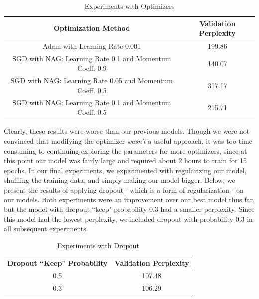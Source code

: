 \documentclass[a4paper]{article}
\begin{document}
\begin{table}[h!]
\centering
\begin{tabular}{|c | c|} 
 \hline
Optimization Method & Validation Perplexity \\ \hline \hline
Adam with Learning Rate 0.001 & 199.86 \\ \hline
SGD with NAG: Learning Rate 0.1 and Momentum Coeff. 0.9 & 140.07\\ \hline
SGD with NAG: Learning Rate 0.05 and Momentum Coeff. 0.5 & 317.17 \\ \hline
SGD with NAG: Learning Rate 0.1 and Momentum Coeff. 0.5 &215.71 \\ \hline
\end{tabular}
\caption{Experiments with Optimizers}
\label{table:1}
\end{table}
Clearly, these results were worse than our previous models. Though we were not convinced that modifying the optimizer \textit{wasn't} a useful approach, it was too time-consuming to continuing exploring the parameters for more optimizers, since at this point our model was fairly large and required about 2 hours to train for 15 epochs. 
\newline
\newline
In our final experiments, we experimented with regularizing our model, shuffling the training data, and simply making our model bigger. Below, we present the results of applying dropout - which is a form of regularization - on our models. Both experiments were an improvement over our best model thus far, but the model with dropout ``keep" probability 0.3 had a smaller perplexity. Since this model had the lowest perplexity, we included dropout with probability 0.3 in all subsequent experiments.

\begin{table}[h!]
\centering
\begin{tabular}{|c | c|} 
 \hline
Dropout ``Keep" Probability & Validation Perplexity \\ \hline \hline
0.5 & 107.48 \\ \hline
0.3 & 106.29\\ \hline
\end{tabular}
\caption{Experiments with Dropout}
\label{table:1}
\end{table}
\end{document}
